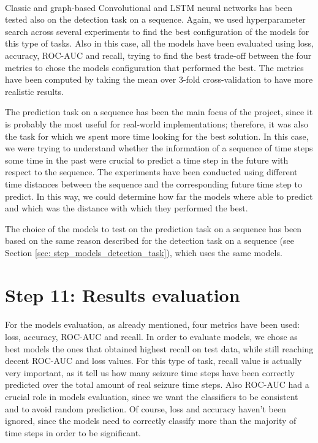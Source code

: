 \paragraph{} Classic and graph-based Convolutional and LSTM neural networks has been tested also on the detection task on a sequence. Again, we used hyperparameter search across several experiments to find the best configuration of the models for this type of tasks. Also in this case, all the models have been evaluated using loss, accuracy, ROC-AUC and recall, trying to find the best trade-off between the four metrics to chose the models configuration that performed the best. The metrics have been computed by taking the mean over 3-fold cross-validation to have more realistic results.

The prediction task on a sequence has been the main focus of the project, since it is probably the most useful for real-world implementations; therefore, it was also the task for which we spent more time looking for the best solution. In this case, we were trying to understand whether the information of a sequence of time steps some time in the past were crucial to predict a time step in the future with respect to the sequence. The experiments have been conducted using different time distances between the sequence and the corresponding future time step to predict. In this way, we could determine how far the models where able to predict and which was the distance with which they performed the best.

The choice of the models to test on the prediction task on a sequence has been based on the same reason described for the detection task on a sequence (see Section \ref{sec: step_models_detection_task}), which uses the same models.


\section{Step 11: Results evaluation} \label{sec: step_restults_evaluation}
\paragraph{} For the models evaluation, as already mentioned, four metrics have been used: loss, accuracy, ROC-AUC and recall. In order to evaluate models, we chose as best models the ones that obtained highest recall on test data, while still reaching decent ROC-AUC and loss values. For this type of task, recall value is actually very important, as it tell us how many seizure time steps have been correctly predicted over the total amount of real seizure time steps. Also ROC-AUC had a crucial role in models evaluation, since we want the classifiers to be consistent and to avoid random prediction. Of course, loss and accuracy haven't been ignored, since the models need to correctly classify more than the majority of time steps in order to be significant.


